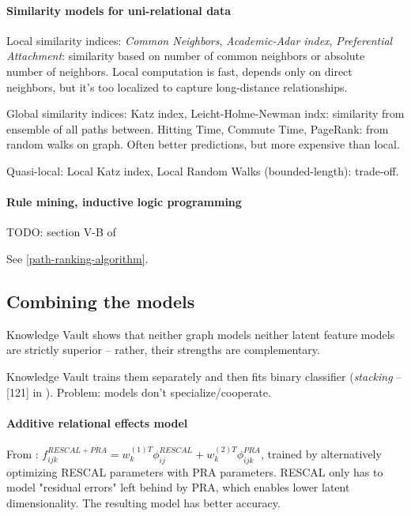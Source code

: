 \paragraph{Similarity models for uni-relational data}

Local similarity indices: \textit{Common Neighbors}, \textit{Academic-Adar
index}, \textit{Preferential Attachment}: similarity based on number of common
neighbors or absolute number of neighbors. Local computation is fast, depends
only on direct neighbors, but it's too localized to capture long-distance
relationships.

Global similarity indices: Katz index, Leicht-Holme-Newman indx: similarity from
ensemble of all paths between. Hitting Time, Commute Time, PageRank: from random
walks on graph. Often better predictions, but more expensive than local.

Quasi-local: Local Katz index, Local Random Walks (bounded-length): trade-off.

\paragraph{Rule mining, inductive logic programming}

TODO: section V-B of \cite{review-of-relational-ml-for-kgs}

See \ref{path-ranking-algorithm}.

\subsection{Combining the models}

Knowledge Vault shows that neither graph models neither latent feature models
are strictly superior -- rather, their strengths are complementary.

Knowledge Vault trains them separately and then fits binary classifier
(\textit{stacking} -- [121] in \cite{review-of-relational-ml-for-kgs}).
Problem: models don't specialize/cooperate.

\paragraph{Additive relational effects model}
From \cite{reducing-the-rank}:
$f_{ijk}^{RESCAL+PRA}=w_k^{(1)T}\phi_{ij}^{RESCAL} +
w_k^{(2)T}\phi_{ijk}^{PRA}$,
trained by alternatively optimizing RESCAL parameters with PRA parameters.
RESCAL only has to model "residual errors" left behind by PRA, which enables
lower latent dimensionality. The resulting model has better accuracy.

